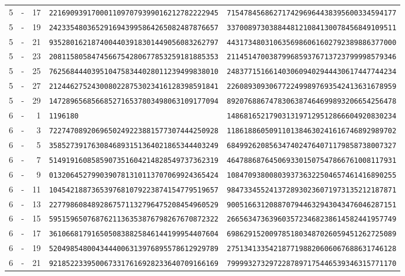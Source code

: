 \begin{longtable}{@{}rcrll@{}}
5&-&17&\texttt{2216909391700011097079399016212782222945}&\texttt{7154784568627174296964438395600334594177}\\
5&-&19&\texttt{2423354803652916943995864265082487876657}&\texttt{3370089730388448121084130078456849109511}\\
5&-&21&\texttt{9352801621874004403918301449056083262797}&\texttt{4431734803106356986061602792389886377000}\\
5&-&23&\texttt{2081158058474566754280677853259181885353}&\texttt{2114514700387996859376713723799998579346}\\
5&-&25&\texttt{7625684440395104758344028011239499838010}&\texttt{2483771516614030609402944430617447744234}\\
5&-&27&\texttt{2124462752430080228753023416128398591841}&\texttt{2260893093067722499897693542413631678959}\\
5&-&29&\texttt{1472896568566852716537803498063109177094}&\texttt{8920768867478306387464699893206654256478}\\
6&-&1&\texttt{1196180}&\texttt{1486816521790313197129512866604920830234}\\
6&-&3&\texttt{7227470892069650249223881577307444250928}&\texttt{1186188605091101384630241616746892989702}\\
6&-&5&\texttt{3585273917630846893151364021865344403249}&\texttt{6849926208563474024764071179858738007327}\\
6&-&7&\texttt{5149191608585907351604214828549737362319}&\texttt{4647886876450693301507547866761008117931}\\
6&-&9&\texttt{0132064527990390781310113707069924365424}&\texttt{1084709380080393736322504657461416890255}\\
6&-&11&\texttt{1045421887365397681079223874154779519657}&\texttt{9847334552413728930236071973135212187871}\\
6&-&13&\texttt{2277986084892867571132796475208454960529}&\texttt{9005166312088707944632943043476046287151}\\
6&-&15&\texttt{5951596507687621136353876798267670872322}&\texttt{2665634736396035723468238614582441957749}\\
6&-&17&\texttt{3610668179165050838825846144199954407604}&\texttt{6986291520097851803487026059451262725089}\\
6&-&19&\texttt{5204985480043444006313976895578612929789}&\texttt{2751341335421877198820606067688631746128}\\
6&-&21&\texttt{9218522339500673317616928233640709166169}&\texttt{7999932732972287897175446539346315771170}\\

\end{longtable}
